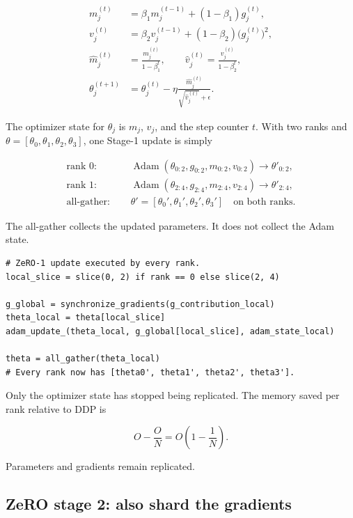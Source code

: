\documentclass[11pt]{article}
\begin{document}
\[
\begin{aligned}
m_j^{(t)} &=
    \beta_1m_j^{(t-1)}+(1-\beta_1)g_j^{(t)},\\
v_j^{(t)} &=
    \beta_2v_j^{(t-1)}+(1-\beta_2)\bigl(g_j^{(t)}\bigr)^2,\\
\widehat m_j^{(t)} &= \frac{m_j^{(t)}}{1-\beta_1^t},
\qquad
\widehat v_j^{(t)} = \frac{v_j^{(t)}}{1-\beta_2^t},\\
\theta_j^{(t+1)} &=
    \theta_j^{(t)}
    -\eta\frac{\widehat m_j^{(t)}}{\sqrt{\widehat v_j^{(t)}}+\epsilon}.
\end{aligned}
\]

The optimizer state for \(\theta_j\) is \(m_j\), \(v_j\), and the step
counter \(t\). With two ranks and
\(\theta=[\theta_0,\theta_1,\theta_2,\theta_3]\), one Stage-1 update is simply

\[
\begin{aligned}
\text{rank 0: }&\quad
  \operatorname{Adam}(\theta_{0:2},g_{0:2},m_{0:2},v_{0:2})
  \longrightarrow \theta'_{0:2},\\
\text{rank 1: }&\quad
  \operatorname{Adam}(\theta_{2:4},g_{2:4},m_{2:4},v_{2:4})
  \longrightarrow \theta'_{2:4},\\
\text{all-gather: }&\quad
  \theta'=[\theta_0',\theta_1',\theta_2',\theta_3']
  \quad\text{on both ranks}.
\end{aligned}
\]

The all-gather collects the updated parameters. It does not collect the Adam
state.

\begin{lstlisting}[basicstyle=\ttfamily\footnotesize]
# ZeRO-1 update executed by every rank.
local_slice = slice(0, 2) if rank == 0 else slice(2, 4)

g_global = synchronize_gradients(g_contribution_local)
theta_local = theta[local_slice]
adam_update_(theta_local, g_global[local_slice], adam_state_local)

theta = all_gather(theta_local)
# Every rank now has [theta0', theta1', theta2', theta3'].
\end{lstlisting}

Only the optimizer state has stopped being replicated. The memory saved per
rank relative to DDP is

\[
O-\frac{O}{N}=O\left(1-\frac{1}{N}\right).
\]

Parameters and gradients remain replicated.

\subsection{ZeRO stage 2: also shard the gradients}
\end{document}
